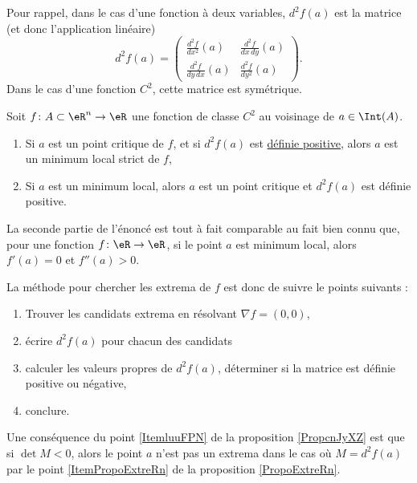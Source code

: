 Pour rappel, dans le cas d'une fonction à deux variables, $d^2f(a)$ est la matrice (et donc l'application linéaire)
\begin{equation}
    d^2f(a)=\begin{pmatrix}
    \frac{ d^2f  }{ dx^2 }(a)   &   \frac{ d^2f  }{ dx\,dy }(a) \\ 
    \frac{ d^2f  }{ dy\,dx }(a)     &   \frac{ d^2f  }{ dy^2 }(a)
\end{pmatrix}.
\end{equation}
Dans le cas d'une fonction $C^2$, cette matrice est symétrique.

\begin{proposition}     \label{PropoExtreRn}
    Soit $f\colon A\subset\eR^n\to \eR$ une fonction de classe $C^2$ au voisinage de $a\in\Int(A)$.
    \begin{enumerate}
        \item
            Si $a$ est un point critique de $f$, et si $d^2f(a)$ est \href{http://fr.wikipedia.org/wiki/Matrice_définie_positive}{définie positive}, alors $a$ est un minimum local strict de $f$,
        \item\label{ItemPropoExtreRn}
            Si $a$ est un minimum local, alors $a$ est un point critique et $d^2f(a)$ est définie positive.
    \end{enumerate}
\end{proposition}
La seconde partie de l'énoncé est tout à fait comparable au fait bien connu que, pour une fonction $f\colon \eR\to \eR$, si le point $a$ est minimum local, alors $f'(a)=0$ et $f''(a)>0$.

La méthode pour chercher les extrema de $f$ est donc de suivre le points suivants :
\begin{enumerate}
    \item
        Trouver les candidats extrema en résolvant $\nabla f=(0,0)$,
    \item
        écrire $d^2f(a)$ pour chacun des candidats
    \item
        calculer les valeurs propres de $d^2f(a)$, déterminer si la matrice est définie positive ou négative,
    \item
        conclure.
\end{enumerate}

Une conséquence du point \ref{ItemluuFPN} de la proposition \ref{PropcnJyXZ} est que si \( \det M<0\), alors le point \( a\) n'est pas  un extrema dans le cas où $M=d^2f(a)$ par le point \ref{ItemPropoExtreRn} de la proposition \ref{PropoExtreRn}.

